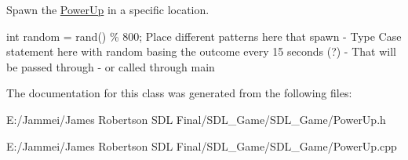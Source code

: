 Spawn the \hyperlink{classgam_1_1_power_up}{Power\+Up} in a specific location. 

int random = rand() \% 800; Place different patterns here that spawn -\/ Type Case statement here with random basing the outcome every 15 seconds (?) -\/ That will be passed through -\/ or called through main 

The documentation for this class was generated from the following files\+:\begin{DoxyCompactItemize}
\item 
E\+:/\+Jammei/\+James Robertson S\+D\+L Final/\+S\+D\+L\+\_\+\+Game/\+S\+D\+L\+\_\+\+Game/Power\+Up.\+h\item 
E\+:/\+Jammei/\+James Robertson S\+D\+L Final/\+S\+D\+L\+\_\+\+Game/\+S\+D\+L\+\_\+\+Game/Power\+Up.\+cpp\end{DoxyCompactItemize}
